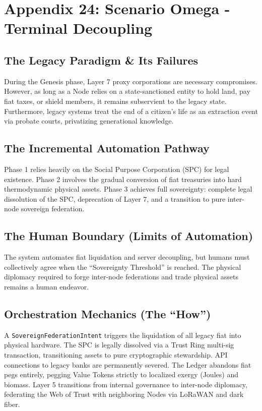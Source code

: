 \chapter{Appendix 24: Scenario Omega - Terminal Decoupling}

\section{The Legacy Paradigm \& Its Failures}
During the Genesis phase, Layer 7 proxy corporations are necessary compromises. However, as long as a Node relies on a state-sanctioned entity to hold land, pay fiat taxes, or shield members, it remains subservient to the legacy state. Furthermore, legacy systems treat the end of a citizen's life as an extraction event via probate courts, privatizing generational knowledge.

\section{The Incremental Automation Pathway}
Phase 1 relies heavily on the Social Purpose Corporation (SPC) for legal existence. Phase 2 involves the gradual conversion of fiat treasuries into hard thermodynamic physical assets. Phase 3 achieves full sovereignty: complete legal dissolution of the SPC, deprecation of Layer 7, and a transition to pure inter-node sovereign federation.

\section{The Human Boundary (Limits of Automation)}
The system automates fiat liquidation and server decoupling, but humans must collectively agree when the ``Sovereignty Threshold'' is reached. The physical diplomacy required to forge inter-node federations and trade physical assets remains a human endeavor.

\section{Orchestration Mechanics (The ``How'')}
A \texttt{SovereignFederationIntent} triggers the liquidation of all legacy fiat into physical hardware. The SPC is legally dissolved via a Trust Ring multi-sig transaction, transitioning assets to pure cryptographic stewardship. API connections to legacy banks are permanently severed. The Ledger abandons fiat pegs entirely, pegging Value Tokens strictly to localized exergy (Joules) and biomass. Layer 5 transitions from internal governance to inter-node diplomacy, federating the Web of Trust with neighboring Nodes via LoRaWAN and dark fiber.
